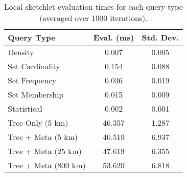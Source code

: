 \begin{table}[h!]
    \renewcommand{\arraystretch}{1.4}
    \caption{Local sketchlet evaluation times for each query type (averaged over 1000 iterations). \vspace{-1em}}
    \label{tbl:query-times}
    \begin{center}
        \begin{tabular}{|l|c|c|}
            \hline
            \textbf{Query Type}      & \textbf{Eval. (ms)} & \textbf{Std. Dev.} \\
            \hline
            Density                  & 0.007                    & 0.005 \\
            \hline
            Set Cardinality          & 0.154                    & 0.088 \\
            \hline
            Set Frequency            & 0.036                    & 0.019 \\
            \hline
            Set Membership           & 0.015                    & 0.009 \\
            \hline
            Statistical               & 0.002                    & 0.001 \\
            \hline
            \hline
            Tree Only (5 km)        & 46.357                   & 1.287 \\
            \hline
            Tree + Meta (5 km)      & 40.510                   & 6.937 \\
            \hline
            Tree + Meta (25 km)     & 47.619                   & 6.355 \\
            \hline
            Tree + Meta (800 km)    & 53.620                   & 6.818 \\
            \hline
        \end{tabular}
    \end{center}
\end{table}
